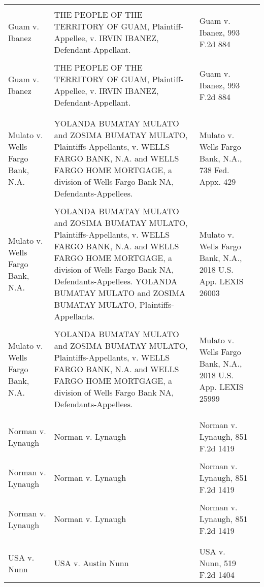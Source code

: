 \documentclass[10pt, letterpaper]{article}
\begin{document}
\begin{spacing}{1.0}
\begin{footnotesize}
\begin{longtable}[H]{>{\raggedright}p{2in}>{\raggedright}p{2in}>{\raggedright}p{2in}p{0in}}
        & & &\\[-4pt]
        Guam v. Ibanez & THE PEOPLE OF THE TERRITORY OF GUAM, Plaintiff-Appellee, v. IRVIN IBANEZ, Defendant-Appellant. & Guam v. Ibanez, 993 F.2d 884 &\\
        & & &\\[-4pt]
        Guam v. Ibanez & THE PEOPLE OF THE TERRITORY OF GUAM, Plaintiff-Appellee, v. IRVIN IBANEZ, Defendant-Appellant. & Guam v. Ibanez, 993 F.2d 884 &\\
        & & &\\[-4pt]
        \hline\\[-4pt]
        Mulato v. Wells Fargo Bank, N.A. & YOLANDA BUMATAY MULATO and ZOSIMA BUMATAY MULATO, Plaintiffs-Appellants, v. WELLS FARGO BANK, N.A. and WELLS FARGO HOME MORTGAGE, a division of Wells Fargo Bank NA, Defendants-Appellees. & Mulato v. Wells Fargo Bank, N.A., 738 Fed. Appx. 429 &\\
        & & &\\[-4pt]
        Mulato v. Wells Fargo Bank, N.A. & YOLANDA BUMATAY MULATO and ZOSIMA BUMATAY MULATO, Plaintiffs-Appellants, v. WELLS FARGO BANK, N.A. and WELLS FARGO HOME MORTGAGE, a division of Wells Fargo Bank NA, Defendants-Appellees. YOLANDA BUMATAY MULATO and ZOSIMA BUMATAY MULATO, Plaintiffs-Appellants. & Mulato v. Wells Fargo Bank, N.A., 2018 U.S. App. LEXIS 26003 &\\
        & & &\\[-4pt]
        Mulato v. Wells Fargo Bank, N.A. & YOLANDA BUMATAY MULATO and ZOSIMA BUMATAY MULATO, Plaintiffs-Appellants, v. WELLS FARGO BANK, N.A. and WELLS FARGO HOME MORTGAGE, a division of Wells Fargo Bank NA, Defendants-Appellees. & Mulato v. Wells Fargo Bank, N.A., 2018 U.S. App. LEXIS 25999 &\\
        & & &\\[-4pt]
        \hline\\[-4pt]
        Norman v. Lynaugh & Norman v. Lynaugh & Norman v. Lynaugh, 851 F.2d 1419 &\\
        & & &\\[-4pt]
        Norman v. Lynaugh & Norman v. Lynaugh & Norman v. Lynaugh, 851 F.2d 1419 &\\
        & & &\\[-4pt]
        Norman v. Lynaugh & Norman v. Lynaugh & Norman v. Lynaugh, 851 F.2d 1419 &\\
        & & &\\[-4pt]
        \hline\\[-4pt]
        USA v. Nunn & USA v. Austin Nunn & USA v. Nunn, 519 F.2d 1404 &\\

\end{longtable}
\end{footnotesize}
\end{spacing}
\end{document}
